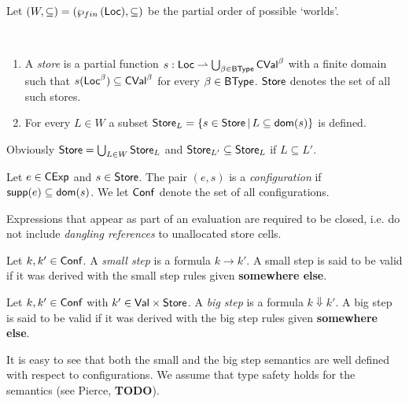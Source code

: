 \documentclass[12pt,a4paper]{report}
\newcommand{\CExp}{\sstyle{CExp}}
\newcommand{\CVal}{\sstyle{CVal}}
\newcommand{\Conf}{\sstyle{Conf}}
\newcommand{\BType}{\sstyle{BType}}
\begin{document}
Let $(W,\subseteq) = (\wp_{fin}\,(\mathsf{Loc}),\subseteq)$ be the partial order of possible `worlds'.

\begin{definition}[Store] \label{definition:Store} \
  \begin{enumerate}
    \item A {\em store} is a partial function $s:\Loc \pto \bigcup_{\beta\in\BType}\CVal^\beta$
      with a finite domain such that $s(\Loc^\beta) \subseteq \CVal^\beta$ for every $\beta\in\BType$.
      $\mathsf{Store}$ denotes the set of all such stores.

    \item For every $L \in W$ a subset $\mathsf{Store}_L = \{s\in\mathsf{Store}\,|\,L\subseteq\mathsf{dom}(s)\}$ is defined.
  \end{enumerate}
\end{definition}

Obviously $\mathsf{Store} = \bigcup_{L\in W} \mathsf{Store}_L$ and $\mathsf{Store}_{L'} \subseteq \mathsf{Store}_L$ if $L \subseteq L'$.

\begin{definition}[Configuration]
  Let $e\in\CExp$ and $s\in\mathsf{Store}$. The pair $(e,s)$ is a {\em configuration}
  if $\mathsf{supp}(e) \subseteq \mathsf{dom}(s)$. We let $\Conf$ denote the set of all configurations.
\end{definition}

Expressions that appear as part of an evaluation are required to be closed, i.e. do not
include {\em dangling references} to unallocated store cells.


\begin{definition}
  Let $k,k'\in\Conf$. A {\em small step} is a formula
  $k \to k'$. A small step is said to be valid if it was derived with
  the small step rules given {\bf somewhere else}.
\end{definition}

\begin{definition}
  Let $k,k'\in\Conf$ with $k' \in \mathsf{Val} \times \mathsf{Store}$. A {\em big step} is a formula
  $k \Downarrow k'$. A big step is said to be valid if it was derived with the
  big step rules given {\bf somewhere else}.
\end{definition}

It is easy to see that both the small and the big step semantics are well defined
with respect to configurations. We assume that type safety holds for the semantics
(see Pierce, {\bf TODO}).
\end{document}
